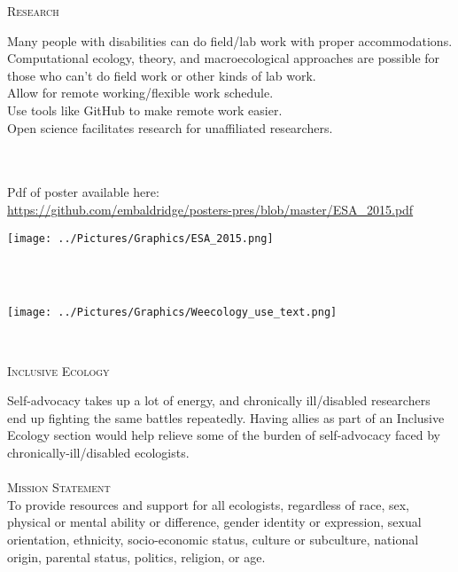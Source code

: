\documentclass{beamer}
\begin{document}
\begin{center}
\begin{minipage}{0.42\linewidth}
\begin{Large}
\textsc{Research\\}
\end{Large}
Many people with disabilities can do field/lab work with proper accommodations.\\
Computational ecology, theory, and macroecological approaches are possible for those who can't do field work or other kinds of lab work.\\
Allow for remote working/flexible work schedule.\\
Use tools like GitHub to make remote work easier.\\
Open science facilitates research for unaffiliated researchers.\\
~\\
~\\
\begin{minipage}{0.60\linewidth}
Pdf of poster available here:\\
\url{https://github.com/embaldridge/posters-pres/blob/master/ESA_2015.pdf}\\
\end{minipage}
\hspace{2cm}
\begin{minipage}{0.3\linewidth}
\texttt{[image: ../Pictures/Graphics/ESA\_2015.png]} 
\end{minipage}
~\\
~\\
\begin{center}
\texttt{[image: ../Pictures/Graphics/Weecology\_use\_text.png]}
\end{center}
\end{minipage}
\hspace{1cm}
\begin{minipage}{0.25\linewidth}
\vspace{0.5cm}
~\\
\begin{Large}
\textsc{Inclusive Ecology}\\
\end{Large}
Self-advocacy takes up a lot of energy, and chronically ill/disabled researchers end up fighting the same battles repeatedly.  Having allies as part of an Inclusive Ecology section would help relieve some of the burden of self-advocacy faced by chronically-ill/disabled ecologists.\\
~\\
\textsc{Mission Statement}\\
To provide resources and support for all ecologists, regardless of race, sex, physical or mental ability or difference, gender identity or expression, sexual orientation, ethnicity, socio-economic status, culture or subculture, national origin,  parental status, politics, religion, or age.\\

\end{minipage}
\end{center}
\end{document}
